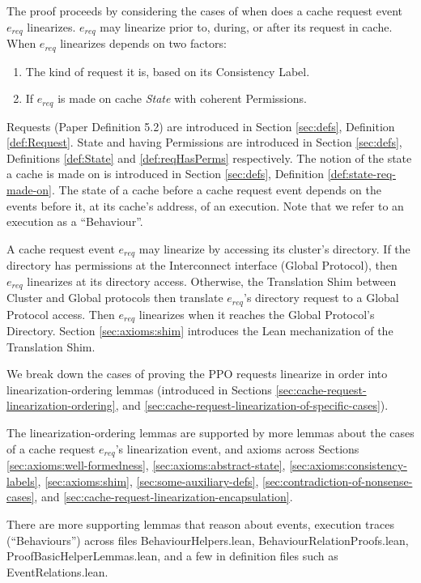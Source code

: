 The proof proceeds by considering the cases of when does a cache request
event $e_{req}$ linearizes.
$e_{req}$ may linearize prior to, during, or after its request in cache.
When $e_{req}$ linearizes depends on two factors:
\begin{enumerate}
  \item
    The kind of request it is,
    based on its Consistency Label.
  \item
    If $e_{req}$ is made on cache \textit{State} with coherent Permissions.
\end{enumerate}
Requests (Paper Definition 5.2) are introduced in Section \ref{sec:defs}, Definition \ref{def:Request}.
State and having Permissions are introduced in Section \ref{sec:defs},
Definitions \ref{def:State} and \ref{def:reqHasPerms} respectively.
The notion of the state a cache is made on is introduced in Section \ref{sec:defs},
Definition \ref{def:state-req-made-on}. The state of a cache before a cache
request event depends on the events before it, at its cache's address, of an
execution. Note that we refer to an execution as a ``Behaviour''.

A cache request event $e_{req}$ may linearize by accessing its cluster's
directory. If the directory has permissions at the
Interconnect interface (Global Protocol), then $e_{req}$ linearizes at its
directory access.
Otherwise, the Translation Shim between Cluster and Global protocols then translate $e_{req}$'s directory request to a Global Protocol access. Then $e_{req}$
linearizes when it reaches the Global Protocol's Directory.
Section \ref{sec:axioms:shim}
introduces the Lean mechanization of the Translation Shim.

We break down the cases of proving the PPO requests linearize in order
into linearization-ordering lemmas
(introduced in Sections \ref{sec:cache-request-linearization-ordering},
and \ref{sec:cache-request-linearization-of-specific-cases}).

The linearization-ordering lemmas are supported by
more lemmas about the cases of a cache request $e_{req}$'s linearization event,
and axioms across Sections \ref{sec:axioms:well-formedness},
\ref{sec:axioms:abstract-state}, \ref{sec:axioms:consistency-labels},
\ref{sec:axioms:shim}, \ref{sec:some-auxiliary-defs},
\ref{sec:contradiction-of-nonsense-cases},
and \ref{sec:cache-request-linearization-encapsulation}.

There are more supporting lemmas that reason about events, execution traces
(``Behaviours'') across files BehaviourHelpers.lean,
BehaviourRelationProofs.lean, ProofBasicHelperLemmas.lean, and
a few in definition files such as EventRelations.lean.

